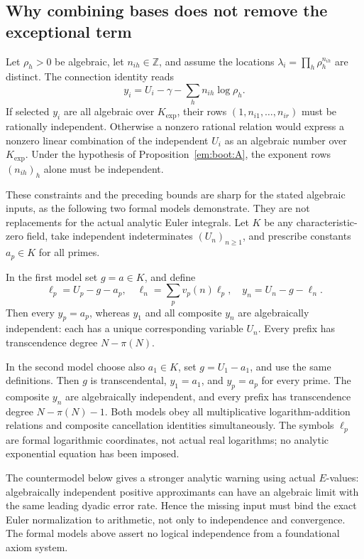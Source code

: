 \documentclass[11pt,a4paper]{article}
\theoremstyle{definition}
\theoremstyle{remark}
\theoremstyle{plain}
\numberwithin{equation}{section}
\begin{document}
\subsection{Why combining bases does not remove the exceptional term}
Let $\rho_h>0$ be algebraic, let $n_{ih}\in\mathbb Z$, and assume the
locations $\lambda_i=\prod_h\rho_h^{n_{ih}}$ are distinct. The connection
identity reads
\[
 y_i=U_i-\gamma-\sum_h n_{ih}\log\rho_h.
\]
If selected $y_i$ are all algebraic over $K_{\exp}$, their rows
$(1,n_{i1},\ldots,n_{ir})$ must be rationally independent. Otherwise a
nonzero rational relation would express a nonzero linear combination
of the independent $U_i$ as an algebraic number over $K_{\exp}$.
Under the hypothesis of Proposition~\ref{em:boot:A}, the exponent rows
$(n_{ih})_h$ alone must be independent.

These constraints and the preceding bounds are sharp for the stated
algebraic inputs, as the following two formal models demonstrate.
They are not replacements for the actual analytic Euler integrals.
Let $K$ be any characteristic-zero field, take independent
indeterminates $(U_n)_{n\ge1}$, and prescribe constants $a_p\in K$
for all primes.

In the first model set $g=a\in K$, and define
\[
 \ell_p=U_p-g-a_p,\quad
 \ell_n=\sum_pv_p(n)\ell_p,\quad y_n=U_n-g-\ell_n.
\]
Then every $y_p=a_p$, whereas $y_1$ and all composite $y_n$ are
algebraically independent: each has a unique corresponding variable
$U_n$. Every prefix has transcendence degree $N-\pi(N)$.

In the second model choose also $a_1\in K$, set $g=U_1-a_1$, and use
the same definitions. Then $g$ is transcendental, $y_1=a_1$, and
$y_p=a_p$ for every prime. The composite $y_n$ are algebraically
independent, and every prefix has transcendence degree
$N-\pi(N)-1$. Both models obey all multiplicative logarithm-addition
relations and composite cancellation identities simultaneously.
The symbols $\ell_p$ are formal logarithmic coordinates, not actual
real logarithms; no analytic exponential equation has been imposed.

The countermodel below gives a stronger analytic warning using actual
$E$-values: algebraically independent positive approximants can have an
algebraic limit with the same leading dyadic error rate. Hence the
missing input must bind the exact Euler normalization to arithmetic,
not only to independence and convergence. The formal models above
assert no logical independence from a foundational axiom system.
\end{document}
